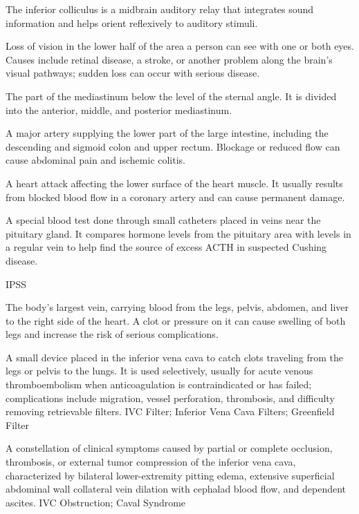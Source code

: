  The inferior colliculus is a midbrain auditory relay that integrates sound information and helps orient reflexively to auditory stimuli.

 Loss of vision in the lower half of the area a person can see with one or both eyes. Causes include retinal disease, a stroke, or another problem along the brain’s visual pathways; sudden loss can occur with serious disease.

 The part of the mediastinum below the level of the sternal angle. It is divided into the anterior, middle, and posterior mediastinum.

 A major artery supplying the lower part of the large intestine, including the descending and sigmoid colon and upper rectum. Blockage or reduced flow can cause abdominal pain and ischemic colitis.

 A heart attack affecting the lower surface of the heart muscle. It usually results from blocked blood flow in a coronary artery and can cause permanent damage.

 A special blood test done through small catheters placed in veins near the pituitary gland. It compares hormone levels from the pituitary area with levels in a regular vein to help find the source of excess ACTH in suspected Cushing disease.

\synonyms
IPSS

 The body’s largest vein, carrying blood from the legs, pelvis, abdomen, and liver to the right side of the heart. A clot or pressure on it can cause swelling of both legs and increase the risk of serious complications.

 A small device placed in the inferior vena cava to catch clots traveling from the legs or pelvis to the lungs. It is used selectively, usually for acute venous thromboembolism when anticoagulation is contraindicated or has failed; complications include migration, vessel perforation, thrombosis, and difficulty removing retrievable filters.
\synonyms
IVC Filter; Inferior Vena Cava Filters; Greenfield Filter

 A constellation of clinical symptoms caused by partial or complete occlusion, thrombosis, or external tumor compression of the inferior vena cava, characterized by bilateral lower-extremity pitting edema, extensive superficial abdominal wall collateral vein dilation with cephalad blood flow, and dependent ascites.
\synonyms
IVC Obstruction; Caval Syndrome

